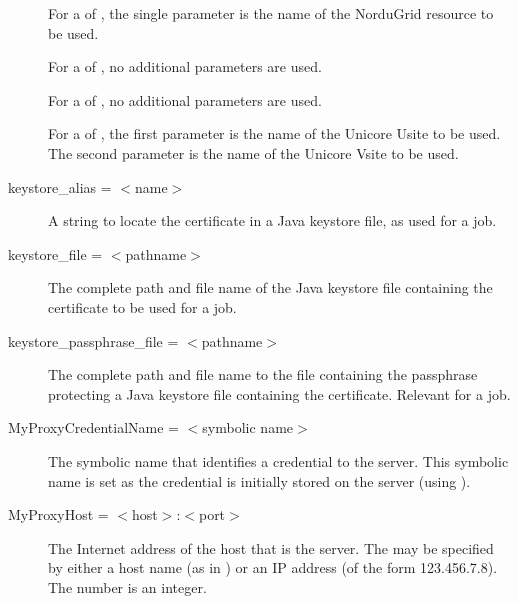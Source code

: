 \begin{description}
For a  of ,
the single parameter is the name of the NorduGrid resource to be used.

For a  of , no additional
parameters are used.

For a  of , no additional
parameters are used.

For a  of ,
the first parameter is the name of the Unicore Usite to be used.
The second parameter is the name of the Unicore Vsite to be used.



\label{condor-submit-keystore-alias}
\item[keystore\_alias = $<$name$>$]
A string to locate the certificate in a Java keystore file,
as used for a  job.


\label{condor-submit-keystore-file}
\item[keystore\_file = $<$pathname$>$]
The complete path and file name of the Java keystore file
containing the certificate to be used for a  job.

\label{condor-submit-passphrase-file}
\item[keystore\_passphrase\_file = $<$pathname$>$]
The complete path and file name
to the file containing the passphrase protecting a Java keystore
file containing the certificate.
Relevant for a  job.


\label{condor-submit-MyProxyCredentialName}
\item[MyProxyCredentialName = $<$symbolic name$>$]
The symbolic name that identifies a credential to the  server.
This symbolic name is set as the credential is
initially stored on the server (using ).



\label{condor-submit-MyProxyHost}
\item[MyProxyHost = $<$host$>$:$<$port$>$]
The Internet address of the host that is the  server.
The  may be specified by either a host name
(as in ) or an IP address
(of the form 123.456.7.8).
The  number is an integer.


\end{description}
